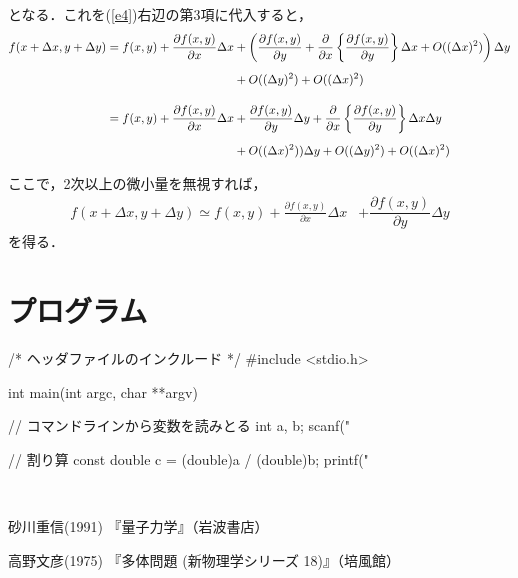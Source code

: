 \documentclass[12pt]{jsarticle}\usepackage{ifthen}\newboolean{enlarge}\setboolean{enlarge}{false}
\begin{document}
となる．これを(\ref{e4})右辺の第3項に代入すると，
\begin{align}\label{e7}
f(x+\Delta x,y+\Delta y)
=f(x,y)+\frac{\partial f(x,y)}{\partial x}\Delta x&+
\left(\dfrac{\partial f(x,y)}{\partial y}+\frac{\partial }{\partial x}
\left\{
\dfrac{\partial f(x,y)}{\partial y}
\right\}
\Delta x+O((\Delta x)^2)\right)
\Delta y\notag\\[5pt]
&+O((\Delta y)^2)+O((\Delta x)^2)\notag\\[10pt]
%
=f(x,y)+\frac{\partial f(x,y)}{\partial x}\Delta x&+\dfrac{\partial f(x,y)}{\partial y}\Delta y+\frac{\partial }{\partial x}
\left\{
\dfrac{\partial f(x,y)}{\partial y}
\right\}\Delta x\Delta y\notag\\[5pt]
&
+O((\Delta x)^2))\Delta y+O((\Delta y)^2)+O((\Delta x)^2)\notag\\[5pt]
\end{align}
ここで，2次以上の微小量を無視すれば，
%
\begin{align}\label{e8}
f(x+\Delta x,y+\Delta y)
%
\simeq f(x,y)+\frac{\partial f(x,y)}{\partial x}\Delta x&+\dfrac{\partial f(x,y)}{\partial y}\Delta y
\end{align}
を得る．


\section{プログラム}
\begin{mylisting}[language=C]
/* ヘッダファイルのインクルード */
#include <stdio.h>

int main(int argc, char **argv) {
    // コマンドラインから変数を読みとる
    int a, b;
    scanf("%

    // 割り算
    const double c = (double)a / (double)b;
    printf("%
}
\end{mylisting}





　\begin{thebibliography}{99}
\item
{砂川重信(1991)
『量子力学』（岩波書店）}
\item
{高野文彦(1975)
『多体問題 (新物理学シリーズ 18)』（培風館）}
\end{thebibliography}
\end{document}

